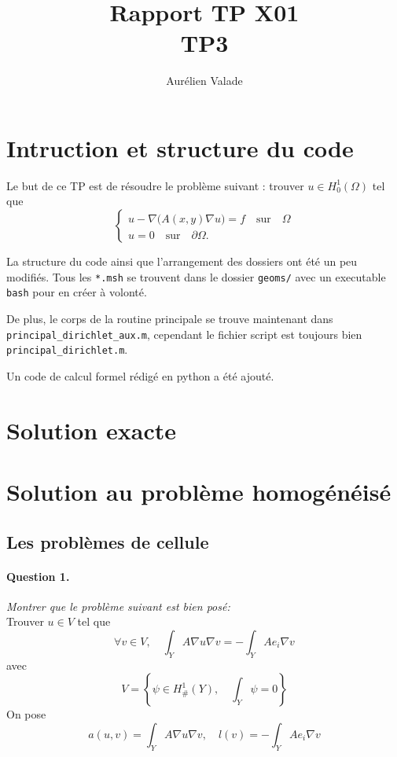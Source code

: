 \documentclass[11pt]{article}
\title{Rapport TP X01 \\ TP3}
\author{Aurélien Valade}
\date{}
\newcommand{\question}[2]{\paragraph{Question #1.}\textit{#2} \\}
\newcommand{\Hd}{H^1_{\#}}
\begin{document}
\maketitle

\section{Intruction et structure du code}


Le but de ce TP est de résoudre le problème suivant : trouver $u \in H^1_0(\Omega)$ tel que  
\begin{equation}
  \begin{cases}
    u - \nabla \big(A(x,y) \nabla u\big) = f \quad \mbox{sur}\quad \Omega\\
    u = 0 \quad \mbox{sur}\quad \partial\Omega.
  \end{cases}
\end{equation}

La structure du code ainsi que l'arrangement des dossiers ont été un peu modifiés. Tous les \texttt{*.msh} se trouvent dans le dossier \texttt{geoms/} avec un executable \texttt{bash} pour en créer à volonté.

De plus, le corps de la routine principale se trouve maintenant dans \texttt{principal\_dirichlet\_aux.m}, cependant le fichier script est toujours bien \texttt{principal\_dirichlet.m}. 

Un code de calcul formel rédigé en python a été ajouté. 

\section{Solution exacte}


\section{Solution au problème homogénéisé}

\subsection{Les problèmes de cellule}

\question{1}{Montrer que le problème suivant est bien posé:}

Trouver $u \in V$ tel que
\begin{equation}
  \label{eq:pbcell}
  \forall v \in V, \quad \int_Y A \nabla u \nabla v = - \int_Y A e_i \nabla v
\end{equation}
avec
\begin{equation}
  V = 
  \left\{
    \psi \in \Hd(Y), \quad \int_Y \psi = 0
  \right\}
\end{equation}
On pose
\begin{equation}
  a(u,v) = \int_Y A \nabla u \nabla v, \quad
  l(v) = -\int_Y A e_i \nabla v
\end{equation}
\end{document}
